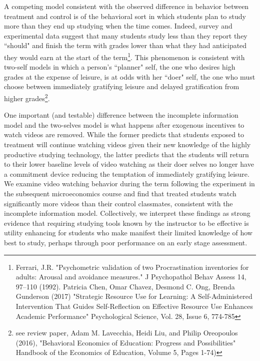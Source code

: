 \documentclass[12pt]{article}
\begin{document}
A competing model consistent with the observed difference in behavior between treatment and control is of the behavioral sort in which students plan to study more than they end up studying when the time comes. Indeed, survey and experimental data suggest that many students study less than they report they ``should" and finish the term with grades lower than what they had anticipated they would earn at the start of the term\footnote{Ferrari, J.R. "Psychometric validation of two Procrastination inventories for adults: Arousal and avoidance measures." J Psychopathol Behav Assess 14, 97–110 (1992). Patricia Chen, Omar Chavez, Desmond C. Ong, Brenda Gunderson (2017) "Strategic Resource Use for Learning: A Self-Administered Intervention That Guides Self-Reflection on Effective Resource Use Enhances Academic Performance" Psychological Science,
	Vol. 28, Issue 6, 774-785
}. This phenomenon is consistent with two-self models in which a person's ``planner" self, the one who desires high grades at the expense of leisure, is at odds with her ``doer" self, the one who must choose between immediately gratifying leisure and delayed gratification from higher grades\footnote{see review paper, Adam M. Lavecchia, Heidi Liu, and Philip Oreopoulos (2016), "Behavioral Economics of Education: Progress and Possibilities"  Handbook of the Economics of Education, Volume 5, Pages 1-74)}. %

One important (and testable) difference between the incomplete information model and the two-selves model is what happens after exogenous incentives to watch videos are removed. While the former predicts that students exposed to treatment will continue watching videos given their new knowledge of the highly productive studying technology, the latter predicts that the students will return to their lower baseline levels of video watching as their doer selves no longer have a commitment device reducing the temptation of immediately gratifying leisure. We examine video watching behavior during the term following the experiment in the subsequent microeconomics course and find that treated students watch significantly more videos than their control classmates, consistent with the incomplete information model. Collectively, we interpret these findings as strong evidence that requiring studying tools known by the instructor to be effective is utility enhancing for students who make manifest their limited knowledge of how best to study, perhaps through poor performance on an early stage assessment.
\end{document}
